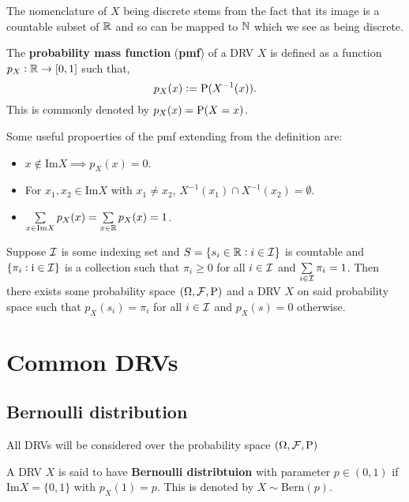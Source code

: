 \begin{remark}
    The nomenclature of $X$ being discrete stems from the fact that its image is a countable subset of $\RR$ and so can be mapped to $\NN$ which we see as being discrete.
\end{remark}

\begin{definition}
    The \textbf{probability mass function} (\textbf{pmf}) of a DRV $X$ is defined as a function $p_X: \RR \rightarrow [0,1]$ such that, \[
        p_X(x) := \P(X^{-1}(x))\textcolor{black}{.}
    \]
    This is commonly denoted by $p_X(x) = \P(X=x)$.
\end{definition}

\begin{remark}
    Some useful propoerties of the pmf extending from the definition are:
    \begin{itemize}
        \item $x \not\in \text{Im}X \implies p_X(x) = 0$.
        \item For $x_1, x_2 \in \text{Im}X$ with $x_1 \neq x_2$, $X^{-1}(x_1) \cap X^{-1}(x_2) = \emptyset$.
        \item $\sum\limits_{x\in\text{Im}X}p_X(x) = \sum\limits_{x\in\RR}p_X(x) = 1$.
    \end{itemize}
\end{remark}

\begin{theorem}
    Suppose $\III$ is some indexing set and $S = \{s_i \in \RR: i\in\III\}$ is countable and $\{\pi_i:\i \in \III\}$ is a collection such that $\pi_i \geq 0$ for all $i \in \III$ and $\sum\limits_{i\in\III}\pi_i = 1$. Then there exists some probability space $(\Omega,\FFF,\P)$ and a DRV $X$ on said probability space such that $p_X(s_i)=\pi_i$ for all $i\in\III$ and $p_X(s)=0$ otherwise.
\end{theorem}

\section{Common DRVs}
\subsection{Bernoulli distribution}
All DRVs will be considered over the probability space $(\Omega, \FFF, \P)$
\begin{definition}
    A DRV $X$ is said to have \textbf{Bernoulli distribtuion} with parameter $p\in(0,1)$ if $\text{Im}X = \{0,1\}$ with $p_X(1)=p$. This is denoted by $X \sim \text{Bern}(p)$.
\end{definition}

